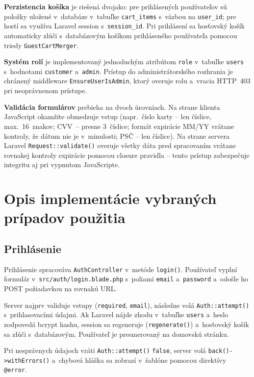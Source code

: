 \documentclass[12pt, a4paper]{article}
\begin{document}
\textbf{Perzistencia košíka} je riešená dvojako: pre prihlásených používateľov sú položky uložené v~databáze v~tabuľke \texttt{cart\_items} s~väzbou na \texttt{user\_id}; pre hostí sa využíva Laravel session s~\texttt{session\_id}. Pri prihlásení sa hosťovský košík automaticky zlúči s~databázovým košíkom prihláseného používateľa pomocou triedy \texttt{GuestCartMerger}.

\textbf{Systém rolí} je implementovaný jednoduchým atribútom \texttt{role} v~tabuľke \texttt{users} s~hodnotami \texttt{customer} a~\texttt{admin}. Prístup do administrátorského rozhrania je chránený middleware \texttt{EnsureUserIsAdmin}, ktorý overuje rolu a~vracia HTTP~403 pri neoprávnenom prístupe.

\textbf{Validácia formulárov} prebieha na dvoch úrovniach. Na strane klienta JavaScript okamžite obmedzuje vstup (napr.\ číslo karty -- len číslice, max.\ 16~znakov; CVV~-- presne 3~číslice; formát expirácie MM/YY vrátane kontroly, že dátum nie je v~minulosti; PSČ -- len číslice). Na strane servera Laravel \texttt{Request::validate()} overuje všetky dáta pred spracovaním vrátane rovnakej kontroly expirácie pomocou closure pravidla -- tento prístup zabezpečuje integritu aj pri vypnutom JavaScripte.

\section{Opis implementácie vybraných prípadov použitia}

\subsection{Prihlásenie}

Prihlásenie spracováva \texttt{AuthController} v~metóde \texttt{login()}. Používateľ vyplní formulár v~\texttt{src/auth/login.blade.php} s~poliami \texttt{email} a~\texttt{password} a~odošle ho POST požiadavkou na rovnakú URL.

Server najprv validuje vstupy (\texttt{required}, \texttt{email}), následne volá \texttt{Auth::attempt()} s~prihlasovacími údajmi. Ak Laravel nájde zhodu v~tabuľke \texttt{users} a~heslo zodpovedá bcrypt hashu, session sa regeneruje (\texttt{regenerate()}) a~hosťovský košík sa zlúči s~databázovým. Používateľ je presmerovaný na domovskú stránku.

Pri nesprávnych údajoch vráti \texttt{Auth::attempt()} \texttt{false}, server volá \texttt{back()->withErrors()} a~chybová hláška sa zobrazí v~šablóne pomocou direktívy \texttt{@error}.
\end{document}
